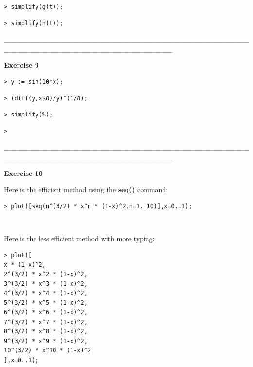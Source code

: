 \documentclass{article}
\begin{document}
\begin{lstlisting}
> simplify(g(t));
\end{lstlisting}
\begin{lstlisting}
> simplify(h(t));
\end{lstlisting}
\begin{Maple Normal}
\_\_\_\_\_\_\_\_\_\_\_\_\_\_\_\_\_\_\_\_\_\_\_\_\_\_\_\_\_\_\_\_\_\_\_\_\_\_\_\_\_\_\_\_\_\_\_\_\_\_\_\_\_\_\_\_\_\_\_\_\_\_\_\_\_\_\_\_\_\_\_\_\_\_\_\_\_\_\_\_\_
\end{Maple Normal}
\begin{Maple Heading 2}
\textbf{Exercise 9}
\end{Maple Heading 2}
\begin{lstlisting}
> y := sin(10*x);
\end{lstlisting}
\begin{lstlisting}
> (diff(y,x$8)/y)^(1/8);
\end{lstlisting}
\begin{lstlisting}
> simplify(%);
\end{lstlisting}
\begin{lstlisting}
> 
\end{lstlisting}
\begin{Maple Normal}
\_\_\_\_\_\_\_\_\_\_\_\_\_\_\_\_\_\_\_\_\_\_\_\_\_\_\_\_\_\_\_\_\_\_\_\_\_\_\_\_\_\_\_\_\_\_\_\_\_\_\_\_\_\_\_\_\_\_\_\_\_\_\_\_\_\_\_\_\_\_\_\_\_\_\_\_\_\_\_\_\_
\end{Maple Normal}
\begin{Maple Heading 2}
\textbf{Exercise 10}
\end{Maple Heading 2}
\begin{Maple Normal}
Here is the efficient method using the \textcolor[RGB]{255,0,0}{\textbf{seq()}} command:\


\end{Maple Normal}
\begin{lstlisting}
> plot([seq(n^(3/2) * x^n * (1-x)^2,n=1..10)],x=0..1);
\end{lstlisting}
\begin{Maple Normal}
\

Here is the less efficient method with more typing:
\end{Maple Normal}
\begin{lstlisting}
> plot([
x * (1-x)^2,
2^(3/2) * x^2 * (1-x)^2,
3^(3/2) * x^3 * (1-x)^2,
4^(3/2) * x^4 * (1-x)^2,
5^(3/2) * x^5 * (1-x)^2,
6^(3/2) * x^6 * (1-x)^2,
7^(3/2) * x^7 * (1-x)^2,
8^(3/2) * x^8 * (1-x)^2,
9^(3/2) * x^9 * (1-x)^2,
10^(3/2) * x^10 * (1-x)^2
],x=0..1);
\end{lstlisting}
\end{document}
